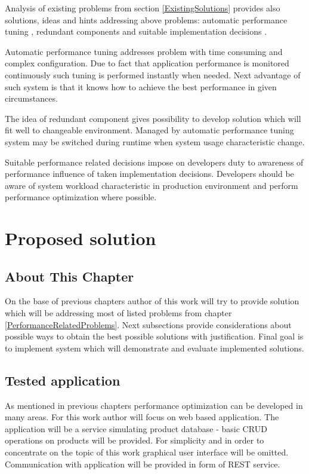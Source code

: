 \documentclass[10pt,a4paper]{article}
\begin{document}
Analysis of existing problems from section \ref{ExistingSolutions} provides also solutions, ideas and hints addressing above problems:
automatic performance tuning \cite{autotuning}\cite{autoarch}\cite{autoframework}, redundant components \cite{redundancycomponent} and suitable implementation decisions \cite{springperformance}. 

Automatic performance tuning addresses problem with time consuming and complex configuration. Due to fact that application performance is monitored continuously such tuning is performed instantly when needed. Next advantage of such system is that it knows how to achieve the best performance in given circumstances. 

The idea of redundant component gives possibility to develop solution which will fit well to changeable environment. Managed by automatic performance tuning system may be switched during runtime when system usage characteristic change. 

Suitable performance related decisions impose on developers duty to awareness of performance influence of taken implementation decisions. Developers should be aware of system workload characteristic in production environment and perform performance optimization where possible. 
 
\section{Proposed solution}

\subsection{About This Chapter}
On the base of previous chapters author of this work will try to provide solution which will be addressing most of listed problems from chapter \ref{PerformanceRelatedProblems}. Next subsections provide considerations about possible ways to obtain the best possible solutions with justification. Final goal is to implement system which will demonstrate and evaluate implemented solutions. 

\subsection{Tested application}  
As mentioned in previous chapters performance optimization can be developed in many areas. For this work author will focus on web based application. The application will be a service simulating product database - basic CRUD operations on products will be provided. For simplicity and in order to concentrate on the topic of this work graphical user interface will be omitted. Communication with application will be provided in form of REST service.  
\end{document}
